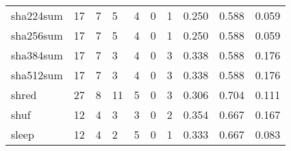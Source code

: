 \begin{longtable}{lp{1.3cm}p{1.3cm}p{1.3cm}p{1.3cm}p{1.3cm}p{1.3cm}p{1.3cm}p{1.3cm}p{1.3cm}}
sha224sum &                     17 &                                             7 &                                            5 &                                           4 &                                            0 &                                          1 &                                0.250 &                                  0.588 &                                0.059 \\
sha256sum &                     17 &                                             7 &                                            5 &                                           4 &                                            0 &                                          1 &                                0.250 &                                  0.588 &                                0.059 \\
sha384sum &                     17 &                                             7 &                                            3 &                                           4 &                                            0 &                                          3 &                                0.338 &                                  0.588 &                                0.176 \\
sha512sum &                     17 &                                             7 &                                            3 &                                           4 &                                            0 &                                          3 &                                0.338 &                                  0.588 &                                0.176 \\
shred     &                     27 &                                             8 &                                           11 &                                           5 &                                            0 &                                          3 &                                0.306 &                                  0.704 &                                0.111 \\
shuf      &                     12 &                                             4 &                                            3 &                                           3 &                                            0 &                                          2 &                                0.354 &                                  0.667 &                                0.167 \\
sleep     &                     12 &                                             4 &                                            2 &                                           5 &                                            0 &                                          1 &                                0.333 &                                  0.667 &                                0.083 \\

\end{longtable}
